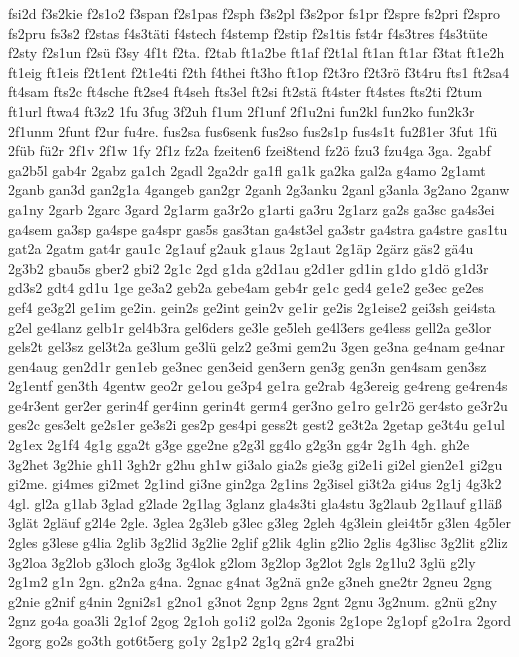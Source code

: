 {fsi2d
f3s2kie
f2s1o2
f3span
f2s1pas
f2sph
f3s2pl
f3s2por
fs1pr
f2spre
fs2pri
f2spro
fs2pru
fs3s2
f2stas
f4s3täti
f4stech
f4stemp
f2stip
f2s1tis
fst4r
f4s3tres
f4s3tüte
f2sty
f2s1un
f2sü
f3sy
4f1t
f2ta.
f2tab
ft1a2be
ft1af
f2t1al
ft1an
ft1ar
f3tat
ft1e2h
ft1eig
ft1eis
f2t1ent
f2t1e4ti
f2th
f4thei
ft3ho
ft1op
f2t3ro
f2t3rö
f3t4ru
fts1
ft2sa4
ft4sam
fts2c
ft4sche
ft2se4
ft4seh
fts3el
ft2si
ft2stä
ft4ster
ft4stes
fts2ti
f2tum
ft1url
ftwa4
ft3z2
1fu
3fug
3f2uh
f1um
2f1unf
2f1u2ni
fun2kl
fun2ko
fun2k3r
2f1unm
2funt
f2ur
fu4re.
fus2sa
fus6senk
fus2so
fus2s1p
fus4s1t
fu2ß1er
3fut
1fü
2füb
fü2r
2f1v
2f1w
1fy
2f1z
fz2a
fzeiten6
fzei8tend
fz2ö
fzu3
fzu4ga
3ga.
2gabf
ga2b5l
gab4r
2gabz
ga1ch
2gadl
2ga2dr
ga1fl
ga1k
ga2ka
gal2a
g4amo
2g1amt
2ganb
gan3d
gan2g1a
4gangeb
gan2gr
2ganh
2g3anku
2ganl
g3anla
3g2ano
2ganw
ga1ny
2garb
2garc
3gard
2g1arm
ga3r2o
g1arti
ga3ru
2g1arz
ga2s
ga3sc
ga4s3ei
ga4sem
ga3sp
ga4spe
ga4spr
gas5s
gas3tan
ga4st3el
ga3str
ga4stra
ga4stre
gas1tu
gat2a
2gatm
gat4r
gau1c
2g1auf
g2auk
g1aus
2g1aut
2g1äp
2gärz
gäs2
gä4u
2g3b2
gbau5s
gber2
gbi2
2g1c
2gd
g1da
g2d1au
g2d1er
gd1in
g1do
g1dö
g1d3r
gd3s2
gdt4
gd1u
1ge
ge3a2
geb2a
gebe4am
geb4r
ge1c
ged4
ge1e2
ge3ec
ge2es
gef4
ge3g2l
ge1im
ge2in.
gein2s
ge2int
gein2v
ge1ir
ge2is
2g1eise2
gei3sh
gei4sta
g2el
ge4lanz
gelb1r
gel4b3ra
gel6ders
ge3le
ge5leh
ge4l3ers
ge4less
gell2a
ge3lor
gels2t
gel3sz
gel3t2a
ge3lum
ge3lü
gelz2
ge3mi
gem2u
3gen
ge3na
ge4nam
ge4nar
gen4aug
gen2d1r
gen1eb
ge3nec
gen3eid
gen3ern
gen3g
gen3n
gen4sam
gen3sz
2g1entf
gen3th
4gentw
geo2r
ge1ou
ge3p4
ge1ra
ge2rab
4g3ereig
ge4reng
ge4ren4s
ge4r3ent
ger2er
gerin4f
ger4inn
gerin4t
germ4
ger3no
ge1ro
ge1r2ö
ger4sto
ge3r2u
ges2c
ges3elt
ge2s1er
ge3s2i
ges2p
ges4pi
gess2t
gest2
ge3t2a
2getap
ge3t4u
ge1ul
2g1ex
2g1f4
4g1g
gga2t
g3ge
gge2ne
g2g3l
gg4lo
g2g3n
gg4r
2g1h
4gh.
gh2e
3g2het
3g2hie
gh1l
3gh2r
g2hu
gh1w
gi3alo
gia2s
gie3g
gi2e1i
gi2el
gien2e1
gi2gu
gi2me.
gi4mes
gi2met
2g1ind
gi3ne
gin2ga
2g1ins
2g3isel
gi3t2a
gi4us
2g1j
4g3k2
4gl.
gl2a
g1lab
3glad
g2lade
2g1lag
3glanz
gla4s3ti
gla4stu
3g2laub
2g1lauf
g1läß
3glät
2gläuf
g2l4e
2gle.
3glea
2g3leb
g3lec
g3leg
2gleh
4g3lein
glei4t5r
g3len
4g5ler
2gles
g3lese
g4lia
2glib
3g2lid
3g2lie
2glif
g2lik
4glin
g2lio
2glis
4g3lisc
3g2lit
g2liz
3g2loa
3g2lob
g3loch
glo3g
3g4lok
g2lom
3g2lop
3g2lot
2gls
2g1lu2
3glü
g2ly
2g1m2
g1n
2gn.
g2n2a
g4na.
2gnac
g4nat
3g2nä
gn2e
g3neh
gne2tr
2gneu
2gng
g2nie
g2nif
g4nin
2gni2s1
g2no1
g3not
2gnp
2gns
2gnt
2gnu
3g2num.
g2nü
g2ny
2gnz
go4a
goa3li
2g1of
2gog
2g1oh
go1i2
gol2a
2gonis
2g1ope
2g1opf
g2o1ra
2gord
2gorg
go2s
go3th
got6t5erg
go1y
2g1p2
2g1q
g2r4
gra2bi
}
